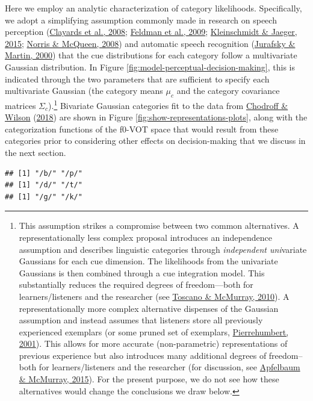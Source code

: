 \documentclass[
  11pt,
  english,
  man,floatsintext]{apa6}
\begin{document}
Here we employ an analytic characterization of category likelihoods. Specifically, we adopt a simplifying assumption commonly made in research on speech perception (\protect\hyperlink{ref-clayards2008}{Clayards et al., 2008}; \protect\hyperlink{ref-feldman2009}{Feldman et al., 2009}; \protect\hyperlink{ref-kleinschmidt-jaeger2015}{Kleinschmidt \& Jaeger, 2015}; \protect\hyperlink{ref-norris-mcqueen2008}{Norris \& McQueen, 2008}) and automatic speech recognition (\protect\hyperlink{ref-jurafsky-martin2000}{Jurafsky \& Martin, 2000}) that the cue distributions for each category follow a multivariate Gaussian distribution. In Figure \ref{fig:model-perceptual-decision-making}, this is indicated through the two parameters that are sufficient to specify each multivariate Gaussian (the category means \(\mu_c\) and the category covariance matrices \(\Sigma_c\)).\footnote{This assumption strikes a compromise between two common alternatives. A representationally less complex proposal introduces an independence assumption and describes linguistic categories through \emph{independent uni}variate Gaussians for each cue dimension. The likelihoods from the univariate Gaussians is then combined through a cue integration model. This substantially reduces the required degrees of freedom---both for learners/listeners and the researcher (see \protect\hyperlink{ref-toscano-mcmurray2010}{Toscano \& McMurray, 2010}). A representationally more complex alternative dispenses of the Gaussian assumption and instead assumes that listeners store all previously experienced exemplars (or some pruned set of exemplars, \protect\hyperlink{ref-pierrehumbert2001}{Pierrehumbert, 2001}). This allows for more accurate (non-parametric) representations of previous experience but also introduces many additional degrees of freedom--both for learners/listeners and the researcher (for discussion, see \protect\hyperlink{ref-apfelbaum-mcmurray2015}{Apfelbaum \& McMurray, 2015}). For the present purpose, we do not see how these alternatives would change the conclusions we draw below.} Bivariate Gaussian categories fit to the data from \protect\hyperlink{ref-chodroff-wilson2018}{Chodroff \& Wilson} (\protect\hyperlink{ref-chodroff-wilson2018}{2018}) are shown in Figure \ref{fig:show-representations-plots}, along with the categorization functions of the f0-VOT space that would result from these categories prior to considering other effects on decision-making that we discuss in the next section.



\begin{verbatim}
## [1] "/b/" "/p/"
## [1] "/d/" "/t/"
## [1] "/g/" "/k/"
\end{verbatim}
\end{document}
